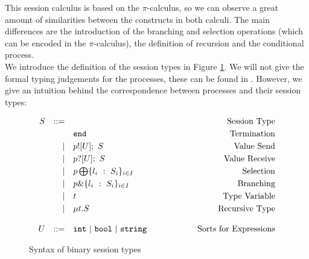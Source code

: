 \documentclass[12pt,twoside]{report}
\newcommand{\comment}[1]{}
\newcommand{\white}{\ \ \ \ \ \ \ \ \ \ \ \ }
\begin{document}
This session calculus is based on the $\pi$-calculus, so we can observe a great amount of similarities between the constructs in both calculi. The main differences are the introduction of the branching and selection operations (which can be encoded in the $\pi$-calculus), the definition of recursion and the conditional process. \\


We introduce the definition of the session types in Figure \ref{bst_session_types}. We will not give the formal typing judgements for the processes, these can be found in \cite{co406, binarysessiontypes1, subtyping}\comment{Course material ref and possibly language primitives}. However, we give an intuition behind the correspondence between processes and their session types:

\begin{figure}[h]
    \centering
    \begin{equation*}
    \centering
    \begin{array}{rrlcr}
        S & ::= && \white & \text{Session\ Type} \\[2.75pt]
             &   & \texttt{end} & \white & \text{Termination}  \\[2.75pt]
             & | & p![U];\ S & \white & \text{Value\ Send} \\[2.75pt]
             & | & p?[U];\ S & \white & \text{Value\ Receive} \\[2.75pt]
             & | & p \bigoplus \{l_i\ :\ S_i\}_{i \in I} & \white& \text{Selection} \\[2.75pt]
             & | & p \& \{l_i\ :\ S_i\}_{i \in I} & \white & \text{Branching} \\[2.75pt] 
             & | & t & \white & \text{Type\ Variable} \\[2.75pt]
             & | & \mu t.S & \white & \text{Recursive\ Type}\\\\
        U & ::= & \texttt{int}\ |\ \texttt{bool}\ |\ \texttt{string}& \white & \text{Sorts\ for\ Expressions}
        \end{array}
    \end{equation*}
    \caption{Syntax of binary session types}
    \label{bst_session_types}
\end{figure}{}
\end{document}
